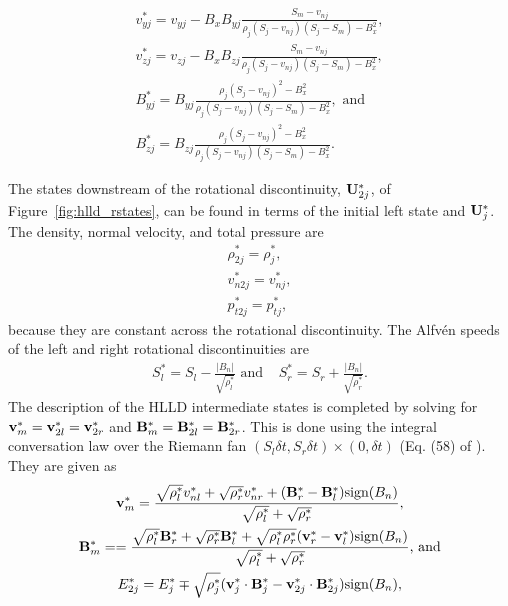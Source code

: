 \begin{gather*}
v^*_{yj} = v_{yj} -B_x B_{yj} \frac{S_m - v_{nj} }
               {\rho_j(S_j - v_{nj})(S_j - S_m) - B_x^2} , \\
v^*_{zj} = v_{zj} - B_x B_{zj} \frac{S_m - v_{nj} }
               {\rho_j(S_j - v_{nj})(S_j - S_m) - B_x^2} , \\
B^*_{yj} = B_{yj} \frac{\rho_j(S_j - v_{nj})^2 - B_x^2} 
                {\rho_j(S_j - v_{nj})(S_j - S_m) - B_x^2} , \text{ and }\\
B^*_{zj} = B_{zj} \frac{ \rho_j(S_j - v_{nj})^2 - B_x^2} 
                {\rho_j(S_j - v_{nj})(S_j - S_m) - B_x^2}. 
\end{gather*}

The states downstream of the rotational discontinuity, $\mathbf{U}^*_{2j}$, of Figure~\ref{fig:hlld_rstates}, can be found in terms of the initial left state and $\mathbf{U}^*_j$.  The density, normal velocity, and total pressure are 
\begin{gather}
\label{eqn:hlld_d2}
\rho^*_{2j} = \rho^*_j , \\
\label{eqn:hlld_vn2}
v^*_{n2j} = v^*_{nj} , \\
\label{eqn:hlld_pt2}
p^*_{t2j} = p^*_{tj} ,
\end{gather}
because they are constant across the rotational discontinuity.  The Alfv{\'e}n speeds of the left and right rotational discontinuities are    
\begin{gather}
\label{eqn:hlld_rd_spd}
S^*_l = S_l - \frac{|B_n|}{\sqrt{\rho^*_l}} \text{ and}\;\;\;\; S^*_r = S_r + \frac{|B_n|}{\sqrt{\rho^*_r}}. 
\end{gather}
The description of the HLLD intermediate states is completed by solving for $\mathbf{v}^*_{m} = \mathbf{v}^*_{2l} = \mathbf{v}^*_{2r}$ and $\mathbf{B}^*_{m} = \mathbf{B}^*_{2l} = \mathbf{B}^*_{2r}$.  This is done using the integral conversation law over the Riemann fan $(S_l \delta t, S_r \delta t) \times (0, \delta t)$ (Eq. (58) of \citep{Miyoshi:2005}).  They are given as  
\begin{gather}
\label{eqn:hlld_vt2}
\mathbf{v}^*_{m} = \frac{\sqrt{\rho^*_l}v_{nl}^* + \sqrt{\rho^*_r}v_{nr}^* + (\mathbf{B}_r^* - \mathbf{B}_l^*)\text{sign}(B_n)}
                {\sqrt{\rho^*_l} + \sqrt{\rho^*_r}} , \\               
\label{eqn:hlld_bt2}
\mathbf{B}^*_{m} = = \frac{\sqrt{\rho^*_l}\mathbf{B}_r^* + \sqrt{\rho^*_r}\mathbf{B}_l^* 
                + \sqrt{\rho^*_l\rho^*_r}(\mathbf{v}_r^* - \mathbf{v}_l^*)\text{sign}(B_n)}
                {\sqrt{\rho^*_l} + \sqrt{\rho^*_r}} \text{, and}\\               
\label{eqn:hlld_en2}
E^*_{2j} = E^*_j \mp  \sqrt{\rho^*_j}(\mathbf{v}^*_{j}\cdot\mathbf{B}^*_{j} 
        - \mathbf{v}^*_{2j}\cdot\mathbf{B}^*_{2j})\text{sign}(B_n) ,
\end{gather}
